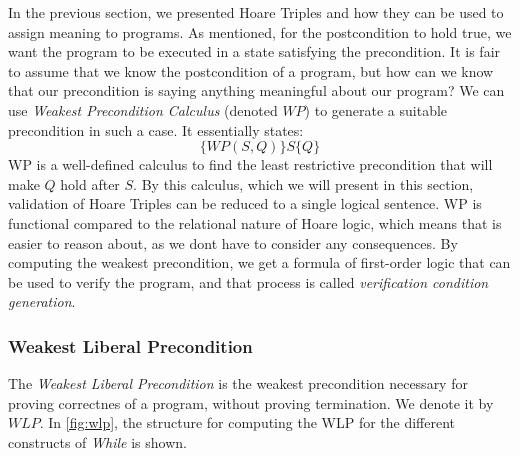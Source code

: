 In the previous section, we presented Hoare Triples and how they can be used to assign meaning to programs. 
As mentioned, for the postcondition to hold true, we want the program to be executed in a state satisfying the precondition. 
It is fair to assume that we know the postcondition of a program, but how can we know that our precondition is saying anything meaningful about our program? 
We can use \textit{Weakest Precondition Calculus} (denoted $WP$) to generate a suitable precondition in such a case.
It essentially states:
$$
\{WP(S,Q)\}S\{Q\}
$$
WP is a well-defined calculus to find the least restrictive precondition that will make $Q$ hold after $S$. 
By this calculus, which we will present in this section, validation of Hoare Triples can be reduced to a single logical sentence. WP is functional compared to the relational nature of Hoare logic, which means that is easier to reason about, as we dont have to consider any consequences.
By computing the weakest precondition, we get a formula of first-order logic that can be used to verify the program, and that process is called \textit{verification condition generation}.

\subsubsection{Weakest Liberal Precondition}
The \textit{Weakest Liberal Precondition} is the weakest precondition necessary for proving correctnes of a program, without proving termination. We denote it by $WLP$.
In \cref{fig:wlp}, the structure for computing the WLP for the different constructs of \textit{While} is shown.

